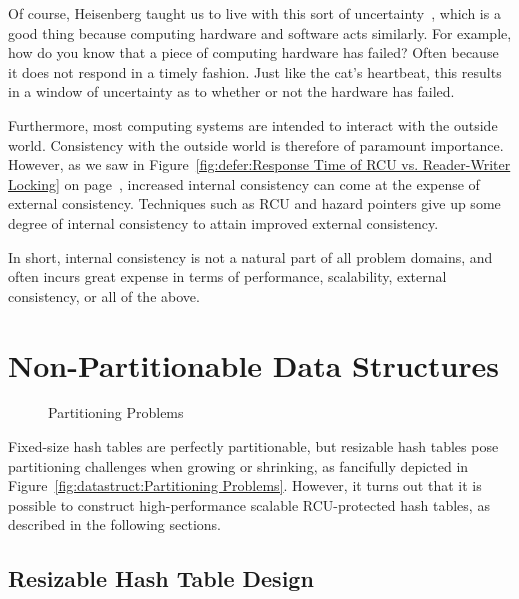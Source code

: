 Of course, Heisenberg taught us to live with this sort of
uncertainty~\cite{WeinerHeisenberg1927Uncertain}, which is a good
thing because computing hardware and software acts similarly.
For example, how do you know that a piece of computing hardware
has failed?
Often because it does not respond in a timely fashion.
Just like the cat's heartbeat, this results in a window of
uncertainty as to whether or not the hardware has failed.

Furthermore, most computing systems are intended to interact with
the outside world.
Consistency with the outside world is therefore of paramount importance.
However, as we saw in
Figure~\ref{fig:defer:Response Time of RCU vs. Reader-Writer Locking}
on
page~\pageref{fig:defer:Response Time of RCU vs. Reader-Writer Locking},
increased internal consistency can come at the expense of external
consistency.
Techniques such as RCU and hazard pointers give up some degree of
internal consistency to attain improved external consistency.

In short, internal consistency is not a natural part of all problem domains,
and often incurs great expense in terms of performance,
scalability, external consistency, or all of the above.

\section{Non-Partitionable Data Structures}
\label{sec:datastruct:Non-Partitionable Data Structures}

\begin{figure}[tb]
\centering
{}
\caption{Partitioning Problems}
\end{figure}

Fixed-size hash tables are perfectly partitionable, but resizable hash
tables pose partitioning challenges when growing or shrinking, as
fancifully depicted in
Figure~\ref{fig:datastruct:Partitioning Problems}.
However, it turns out that it is possible to construct high-performance
scalable RCU-protected hash tables, as described in the following sections.

\subsection{Resizable Hash Table Design}
\label{sec:datastruct:Resizable Hash Table Design}

